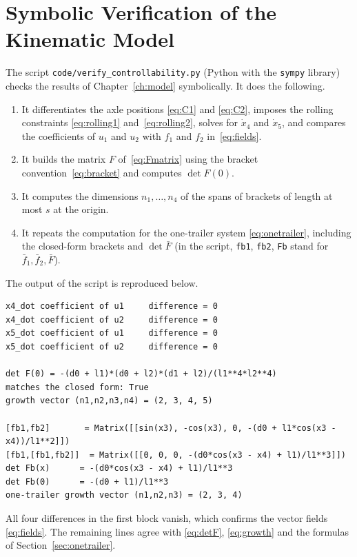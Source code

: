 
\chapter{Symbolic Verification of the Kinematic Model}
\label{app:controllability}

The script \texttt{code/verify\_controllability.py} (Python with the
\texttt{sympy} library) checks the results of Chapter~\ref{ch:model}
symbolically. It does the following.

\begin{enumerate}
  \item It differentiates the axle positions \eqref{eq:C1} and \eqref{eq:C2},
        imposes the rolling constraints \eqref{eq:rolling1}
        and~\eqref{eq:rolling2}, solves for $\dot x_4$ and $\dot x_5$, and
        compares the coefficients of $u_1$ and $u_2$ with $f_{1}$ and $f_{2}$
        in~\eqref{eq:fields}.
  \item It builds the matrix $F$ of~\eqref{eq:Fmatrix} using the bracket
        convention~\eqref{eq:bracket} and computes $\det F(0)$.
  \item It computes the dimensions $n_1,\dots,n_4$ of the spans of brackets
        of length at most $s$ at the origin.
  \item It repeats the computation for the one-trailer system
        \eqref{eq:onetrailer}, including the closed-form brackets and
        $\det\bar F$ (in the script, \texttt{fb1}, \texttt{fb2}, \texttt{Fb}
        stand for $\bar f_1,\bar f_2,\bar F$).
\end{enumerate}

The output of the script is reproduced below.

{\footnotesize\begin{verbatim}
x4_dot coefficient of u1     difference = 0
x4_dot coefficient of u2     difference = 0
x5_dot coefficient of u1     difference = 0
x5_dot coefficient of u2     difference = 0

det F(0) = -(d0 + l1)*(d0 + l2)*(d1 + l2)/(l1**4*l2**4)
matches the closed form: True
growth vector (n1,n2,n3,n4) = (2, 3, 4, 5)

[fb1,fb2]       = Matrix([[sin(x3), -cos(x3), 0, -(d0 + l1*cos(x3 - x4))/l1**2]])
[fb1,[fb1,fb2]]  = Matrix([[0, 0, 0, -(d0*cos(x3 - x4) + l1)/l1**3]])
det Fb(x)      = -(d0*cos(x3 - x4) + l1)/l1**3
det Fb(0)      = -(d0 + l1)/l1**3
one-trailer growth vector (n1,n2,n3) = (2, 3, 4)
\end{verbatim}}

All four differences in the first block vanish, which confirms the vector
fields \eqref{eq:fields}. The remaining lines agree with
\eqref{eq:detF}, \eqref{eq:growth} and the formulas of
Section~\ref{sec:onetrailer}.
